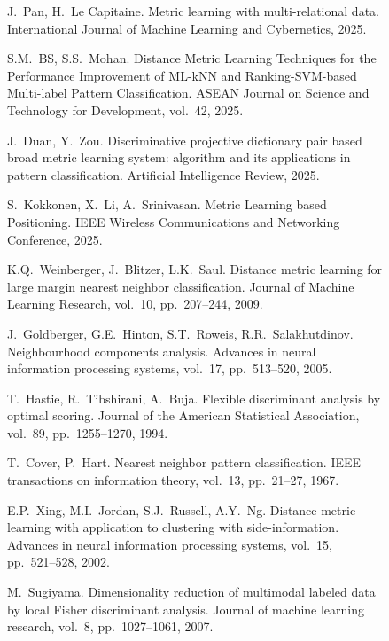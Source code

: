 \documentclass[review]{elsarticle}
\begin{document}
\begin{figure}[htbp]
\begin{thebibliography}{50}
J.~Pan, H.~Le Capitaine.
\newblock Metric learning with multi-relational data.
\newblock International Journal of Machine Learning and Cybernetics, 2025.

S.M.~BS, S.S.~Mohan.
\newblock Distance Metric Learning Techniques for the Performance Improvement of ML-kNN and Ranking-SVM-based Multi-label Pattern Classification.
\newblock ASEAN Journal on Science and Technology for Development, vol.~42, 2025.

J.~Duan, Y.~Zou.
\newblock Discriminative projective dictionary pair based broad metric learning system: algorithm and its applications in pattern classification.
\newblock Artificial Intelligence Review, 2025.

S.~Kokkonen, X.~Li, A.~Srinivasan.
\newblock Metric Learning based Positioning.
 IEEE Wireless Communications and Networking Conference, 2025.

K.Q.~Weinberger, J.~Blitzer, L.K.~Saul.
\newblock Distance metric learning for large margin nearest neighbor classification.
\newblock Journal of Machine Learning Research, vol.~10, pp.~207--244, 2009.

J.~Goldberger, G.E.~Hinton, S.T.~Roweis, R.R.~Salakhutdinov.
\newblock Neighbourhood components analysis.
\newblock Advances in neural information processing systems, vol.~17, pp.~513--520, 2005.

T.~Hastie, R.~Tibshirani, A.~Buja.
\newblock Flexible discriminant analysis by optimal scoring.
\newblock Journal of the American Statistical Association, vol.~89, pp.~1255--1270, 1994.

T.~Cover, P.~Hart.
\newblock Nearest neighbor pattern classification.
\newblock IEEE transactions on information theory, vol.~13, pp.~21--27, 1967.

E.P.~Xing, M.I.~Jordan, S.J.~Russell, A.Y.~Ng.
\newblock Distance metric learning with application to clustering with side-information.
\newblock Advances in neural information processing systems, vol.~15, pp.~521--528, 2002.

M.~Sugiyama.
\newblock Dimensionality reduction of multimodal labeled data by local Fisher discriminant analysis.
\newblock Journal of machine learning research, vol.~8, pp.~1027--1061, 2007.


\end{thebibliography}
\end{figure}
\end{document}
